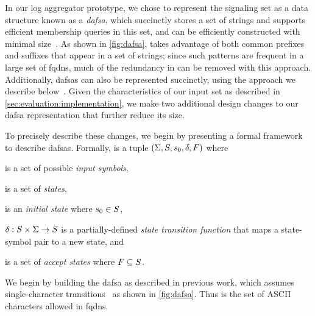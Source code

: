 In our log aggregator prototype, we chose to represent the signaling set as a
data structure known as a \emph{\ac{dafsa}}, which succinctly stores a set of
strings and supports efficient membership queries in this set, and can be
efficiently constructed with minimal size~\cite{daciuk2000incremental}. As shown
in \autoref{fig:dafsa},  takes advantage of both common prefixes and
suffixes that appear in a set of strings; since such patterns are frequent in a
large set of \acp{fqdn}, much of the redundancy in \httpsset can be removed with
this approach. Additionally, \acp{dafsa} can also be represented succinctly,
using the approach we describe below~\cite{daciuk2012smaller}. Given the
characteristics of our input set as described in
\autoref{sec:evaluation:implementation}, we make two additional design
changes to our \ac{dafsa} representation that further reduce its size.

To precisely describe these changes, we begin by presenting a formal framework
to describe \acp{dafsa}. Formally,  is a tuple $(\Sigma, S,
s_0, \delta, F)$ where
\begin{inparaenum}
\item \symbols is a set of possible \emph{input symbols},
\item \states is a set of \emph{states},
\item \initstate is an \emph{initial state} where $s_0 \in S$,
\item $\delta: S \times \Sigma \to S$ is a partially-defined
  \emph{state transition function} that maps a state-symbol pair to a new state,
  and
\item \finalstates is a set of \emph{accept states} where $F
  \subseteq S$.
\end{inparaenum}
We begin by building the \ac{dafsa} as described in previous work, which assumes
single-character transitions~\cite{daciuk2000incremental} as shown in
\autoref{fig:dafsa}. Thus \symbols is the set of ASCII characters allowed in
\acp{fqdn}.

